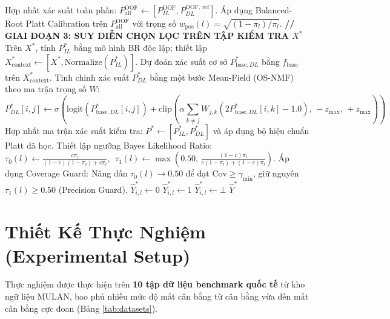 \documentclass[10pt,a4paper,twoside]{article}
\begin{document}
\begin{algorithm}[H]
\begin{algorithmic}[1]
\State Hợp nhất xác suất toàn phần: $P^{\text{OOF}}_{\text{all}} \gets [P^{\text{OOF}}_{IL}, P^{\text{OOF, ref}}_{DL}]$.
\State Áp dụng Balanced-Root Platt Calibration trên $P^{\text{OOF}}_{\text{all}}$ với trọng số $w_{\text{pos}}(l) = \sqrt{(1 - \pi_l) / \pi_l}$.
\Statex \textbf{// GIAI ĐOẠN 3: SUY DIỄN CHỌN LỌC TRÊN TẬP KIỂM TRA $X^*$}
\State Trên $X^*$, tính $P^*_{IL}$ bằng mô hình BR độc lập; thiết lập $X^*_{\text{context}} \gets [X^*, \text{Normalize}(P^*_{IL})]$.
\State Dự đoán xác suất cơ sở $P^*_{\text{base}, DL}$ bằng $f_{\text{base}}$ trên $X^*_{\text{context}}$.
\State Tinh chỉnh xác suất $P^*_{DL}$ bằng một bước Mean-Field (OS-NMF) theo ma trận trọng số $W$:
      $$P^*_{DL}[i, j] \gets \sigma\left(\text{logit}(P^*_{\text{base}, DL}[i, j]) + \text{clip}\left(\alpha \sum_{k \neq j} W_{j, k} (2 P^*_{\text{base}, DL}[i, k] - 1.0), \, -z_{\max}, \, +z_{\max}\right)\right)$$
\State Hợp nhất ma trận xác suất kiểm tra: $P^* \gets [P^*_{IL}, P^*_{DL}]$ và áp dụng bộ hiệu chuẩn Platt đã học.
\State Thiết lập ngưỡng Bayes Likelihood Ratio: $\tau_0(l) \gets \frac{c \pi_l}{(1-c)(1-\pi_l) + c \pi_l}$, $\; \tau_1(l) \gets \max\left(0.50, \, \frac{(1-c)\pi_l}{c(1-\pi_l) + (1-c)\pi_l}\right)$.
    \State Áp dụng Coverage Guard: Nâng dần $\tau_0(l) \to 0.50$ để đạt $\text{Cov} \ge \gamma_{\min}$, giữ nguyên $\tau_1(l) \ge 0.50$ (Precision Guard).
\EndIf
{}
     \State $\hat{Y}^*_{i, l} \gets 0$ 
     \State $\hat{Y}^*_{i, l} \gets 1$ 
    \Else \State $\hat{Y}^*_{i, l} \gets \bot$  \EndIf
\EndFor
\State \Return $\hat{Y}^*$
\end{algorithmic}
\end{algorithm}

\section{Thiết Kế Thực Nghiệm (Experimental Setup)}
Thực nghiệm được thực hiện trên \textbf{10 tập dữ liệu benchmark quốc tế} từ kho ngữ liệu MULAN, bao phủ nhiều mức độ mất cân bằng từ cân bằng vừa đến mất cân bằng cực đoan (Bảng \ref{tab:datasets}).
\end{document}
